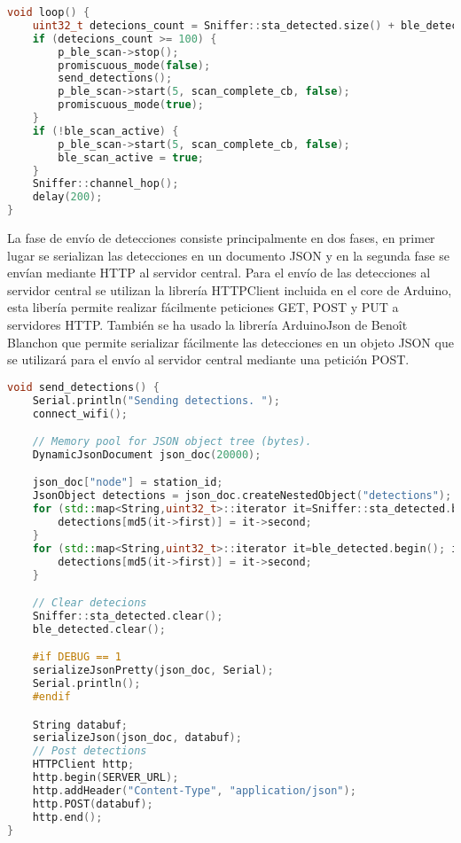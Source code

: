 \documentclass[../proyecto.tex]{subfiles}
\begin{document}
\begin{minipage}{\linewidth}
\begin{lstlisting}[language=C++, caption=Bucle principal , captionpos=b, frame=single]
void loop() {
    uint32_t detecions_count = Sniffer::sta_detected.size() + ble_detected.size();
    if (detecions_count >= 100) {
        p_ble_scan->stop();
        promiscuous_mode(false);
        send_detections();
        p_ble_scan->start(5, scan_complete_cb, false);
        promiscuous_mode(true);
    }
    if (!ble_scan_active) {
        p_ble_scan->start(5, scan_complete_cb, false);
        ble_scan_active = true;
    }
    Sniffer::channel_hop();
    delay(200);
}
\end{lstlisting}
\end{minipage}

La fase de envío de detecciones consiste principalmente en dos fases, en primer lugar se serializan las detecciones en un documento JSON  y en la segunda fase se envían mediante HTTP al servidor central. Para el envío de las detecciones al servidor central se utilizan la librería HTTPClient incluida en el core de Arduino, esta libería permite realizar fácilmente peticiones GET, POST y PUT a servidores HTTP. También se ha usado la librería ArduinoJson de Benoît Blanchon que permite serializar fácilmente las detecciones en un objeto JSON que se utilizará para el envío al servidor central mediante una petición POST.

\begin{minipage}{\linewidth}
\begin{lstlisting}[language=C++, caption=Envío de detecciones al servidor central , captionpos=b, frame=single]
void send_detections() {
    Serial.println("Sending detections. ");
    connect_wifi();

    // Memory pool for JSON object tree (bytes).
    DynamicJsonDocument json_doc(20000);

    json_doc["node"] = station_id;
    JsonObject detections = json_doc.createNestedObject("detections");
    for (std::map<String,uint32_t>::iterator it=Sniffer::sta_detected.begin(); it!=Sniffer::sta_detected.end(); ++it) {
        detections[md5(it->first)] = it->second;
    }
    for (std::map<String,uint32_t>::iterator it=ble_detected.begin(); it!=ble_detected.end(); ++it) {
        detections[md5(it->first)] = it->second;
    }

    // Clear detecions
    Sniffer::sta_detected.clear();
    ble_detected.clear();

    #if DEBUG == 1
    serializeJsonPretty(json_doc, Serial);
    Serial.println();
    #endif

    String databuf;
    serializeJson(json_doc, databuf);
    // Post detections
    HTTPClient http;
    http.begin(SERVER_URL);
    http.addHeader("Content-Type", "application/json");
    http.POST(databuf);
    http.end();
}
\end{lstlisting}
\end{minipage}
\end{document}

